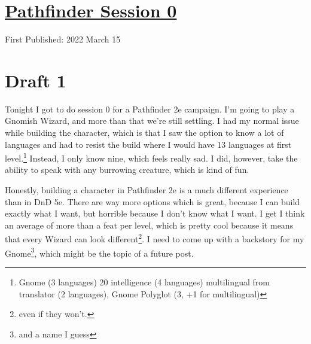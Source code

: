 \documentclass[12pt]{article}[titlepage]
\renewcommand{\,}{\textsuperscript{,}}
\begin{document}
\doublespacing
\section{\href{pathfinder-0.html}{Pathfinder Session 0}}
First Published: 2022 March 15

\section{Draft 1}
Tonight I got to do session 0 for a Pathfinder 2e campaign.
I'm going to play a Gnomish Wizard, and more than that we're still settling.
I had my normal issue while building the character, which is that I saw the option to know a lot of languages and had to resist the build where I would have 13 languages at first level.\footnote{Gnome (3 languages) 20 intelligence (4 languages) multilingual from translator (2 languages), Gnome Polyglot (3, +1 for multilingual)}
Instead, I only know nine, which feels really sad.
I did, however, take the ability to speak with any burrowing creature, which is kind of fun.

Honestly, building a character in Pathfinder 2e is a much different experience than in DnD 5e.
There are way more options which is great, because I can build exactly what I want, but horrible because I don't know what I want.
I get I think an average of more than a feat per level, which is pretty cool because it means that every Wizard can look different\footnote{even if they won't.}.
I need to come up with a backstory for my Gnome\footnote{and a name I guess}, which might be the topic of a future post.
\end{document}
